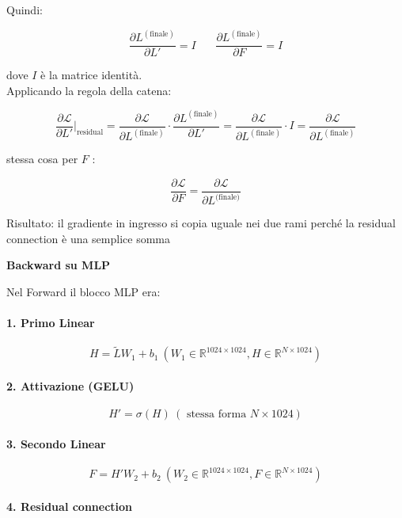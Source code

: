 \documentclass[
  11pt,
]{article}
\begin{document}
Quindi:

\[\frac{\partial L^{(\text{finale})}}{\partial L'} = I\ \ \ \ \ \ \ \ \frac{\partial L^{(\text{finale})}}{\partial F} = I\]

dove \(I\) è la matrice identità.\\
Applicando la regola della catena:

\[\frac{\partial\mathcal{L}}{\partial L'}\Big|_{\text{residual}} = \frac{\partial\mathcal{L}}{\partial L^{(\text{finale})}} \cdot \frac{\partial L^{(\text{finale})}}{\partial L'} = \frac{\partial\mathcal{L}}{\partial L^{(\text{finale})}} \cdot I = \frac{\partial\mathcal{L}}{\partial L^{(\text{finale})}}\]

stessa cosa per \(F\) :

\[\frac{\partial\mathcal{L}}{\partial F} = \frac{\partial\mathcal{L}}{\partial L^{\text{(finale)}}}\]

Risultato: il gradiente in ingresso si copia uguale nei due rami perché
la residual connection è una semplice somma

\textbf{Backward su MLP}

Nel Forward il blocco MLP era:

\paragraph{1. \textbf{Primo Linear}}

\[H = \widetilde{L}W_{1} + b_{1}\ \left( W_{1} \in \mathbb{R}^{1024 \times 1024},H \in \mathbb{R}^{N \times 1024} \right)\]

\paragraph{2. \textbf{Attivazione (GELU)}}

\[H' = \sigma(H)\ (\text{ stessa forma } N \times 1024)\]

\paragraph{3. \textbf{Secondo Linear}}

\[F = H'W_{2} + b_{2}\ \left( W_{2} \in \mathbb{R}^{1024 \times 1024},F \in \mathbb{R}^{N \times 1024} \right)\]

\paragraph{4. \textbf{Residual connection}}
\end{document}
